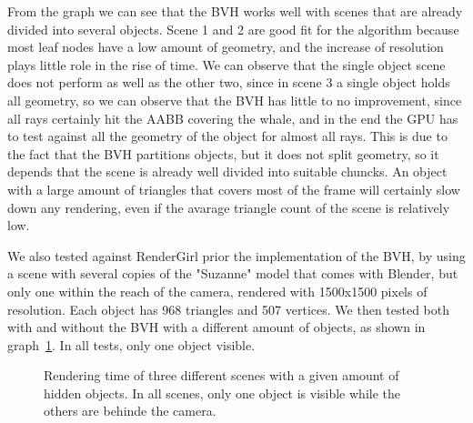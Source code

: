 \documentclass{vgtc}
\begin{document}
From the graph we can see that the BVH works well with scenes that are
already divided into several objects. Scene 1 and 2 are good fit for
the algorithm because most leaf nodes have a low amount of geometry,
and the increase of resolution plays little role in the rise of
time. We can observe that the single object scene does not perform as
well as the other two, since in scene 3 a single object holds all
geometry, so we can observe that the BVH has little to no improvement,
since all rays certainly hit the AABB covering the whale, and in the
end the GPU has to test against all the geometry of the object for
almost all rays. This is due to the fact that the BVH partitions
objects, but it does not split geometry, so it depends that the scene
is already well divided into suitable chuncks. An object with a large
amount of triangles that covers most of the frame will certainly slow
down any rendering, even if the avarage triangle count of the scene is
relatively low.

We also tested against RenderGirl prior the implementation of the BVH,
by using a scene with several copies of the "Suzanne" model that comes
with Blender, but only one within the reach of the camera, rendered
with 1500x1500 pixels of resolution. Each object has 968 triangles and
507 vertices. We then tested both with and without the BVH with a
different amount of objects, as shown in
graph~\ref{fig:bvh-no-bvh-results}. In all tests, only one object
visible.

\begin{figure}
\centering
{}
\caption{Rendering time of three different scenes with a given amount
  of hidden objects. In all scenes, only one object is visible while
  the others are behinde the camera.}
\label{fig:bvh-no-bvh-results}
\end{figure}
\end{document}
